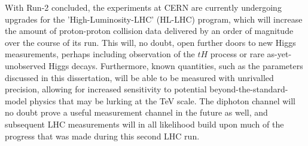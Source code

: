 With Run-2 concluded, the experiments at CERN are currently undergoing upgrades for the 'High-Luminosity-LHC' (HL-LHC) program, which will increase the amount of proton-proton collision data delivered by an order of magnitude over the course of its run. This will, no doubt, open further doors to new Higgs measurements, perhaps including observation of the $tH$ process or rare as-yet-unobserved Higgs decays. Furthermore, known quantities, such as the parameters discussed in this dissertation, will be able to be measured with unrivalled precision, allowing for increased sensitivity to potential beyond-the-standard-model physics that may be lurking at the TeV scale. The diphoton channel will no doubt prove a useful measurement channel in the future as well, and subsequent LHC measurements will in all likelihood build upon much of the progress that was made during this second LHC run.
